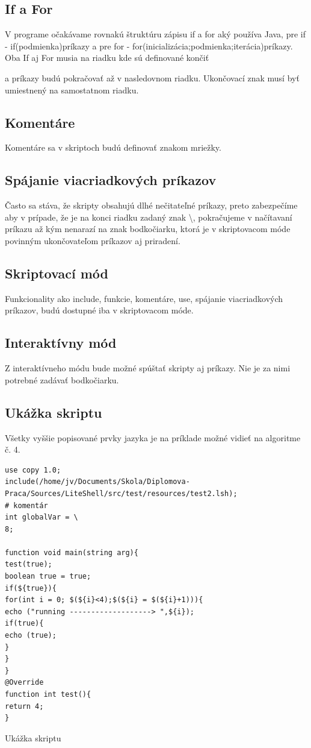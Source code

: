 \subsection{If a For}
\indent V programe očakávame rovnakú štruktúru zápisu if a for aký používa Java, pre if - if(podmienka){príkazy} a pre for - for(inicializácia;podmienka;iterácia){príkazy}. Oba If aj For musia na riadku kde sú definované končiť { a príkazy budú pokračovať až v nasledovnom riadku. Ukončovací znak musí byť umiestnený na samostatnom riadku.
\subsection{Komentáre}
\indent	Komentáre sa v skriptoch budú definovať znakom mriežky.
\subsection{Spájanie viacriadkových príkazov}
\indent Často sa stáva, že skripty obsahujú dlhé nečitateľné príkazy, preto zabezpečíme aby v prípade, že je na konci riadku zadaný znak \textbackslash, pokračujeme v načítavaní príkazu až kým nenarazí na znak bodkočiarku, ktorá je v skriptovacom móde povinným ukončovateľom príkazov aj priradení.
\subsection{Skriptovací mód}
\indent Funkcionality ako include, funkcie, komentáre, use, spájanie viacriadkových príkazov, budú dostupné iba v skriptovacom móde.
\subsection{Interaktívny mód}
\indent Z interaktívneho módu bude možné spúštať skripty aj príkazy. Nie je za nimi potrebné zadávať bodkočiarku. 
\subsection{Ukážka skriptu}
\indent Všetky vyššie popisované prvky jazyka je na príklade možné vidieť na algoritme č. 4.
\begin{algorithm}[H]
	\begin{verbatim}
use copy 1.0;
include(/home/jv/Documents/Skola/Diplomova-Praca/Sources/LiteShell/src/test/resources/test2.lsh);
# komentár
int globalVar = \
8;

function void main(string arg){
test(true);
boolean true = true;
if(${true}){
for(int i = 0; $(${i}<4);$(${i} = $(${i}+1))){
echo ("running -------------------> ",${i});
if(true){
echo (true);
}
}
}
@Override
function int test(){
return 4;
}
	\end{verbatim}
		\caption{Ukážka skriptu}
	\label{alg:gen}
	\end{algorithm}
\newpage
}
